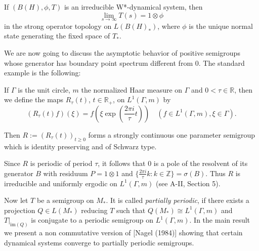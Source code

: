 \begin{corollary}\label{cor:d4-3-9}
If \((B(H),\phi,T)\) is an irreducible W*-dynamical system, then
\[
\lim_{s \to \infty} T(s) = 1 \otimes \phi
\]
in the strong operator topology on \(L(B(H)_{*})\), where \(\phi\) is the unique normal state generating the fixed space of \(T_{*}\).
\end{corollary}

We are now going to discuss the asymptotic behavior of positive semigroups whose generator has boundary point spectrum different from \(0\).
The standard example is the following:

If \(\Gamma\) is the unit circle, \(m\) the normalized Haar measure on \(\Gamma\) and \(0 < \tau \in \mathbb{R}\), then we define the maps \(R_{\tau}(t)\), \(t \in \mathbb{R}_{+}\), on \(L^{1}(\Gamma,m)\) by
\[
(R_{\tau}(t)f)(\xi) = f(\xi\exp(\frac{2\pi i}{\tau}t)) \quad (f \in L^{1}(\Gamma,m), \xi \in \Gamma).
\]

Then \(R := (R_{\tau}(t))_{t \geq 0}\) forms a strongly continuous one parameter semigroup which is identity preserving and of Schwarz type.


\newpage

Since \(R\) is periodic of period \(\tau\), it follows that 0 is a pole of the resolvent of its generator \(B\) with residuum \(P = 1 \otimes 1\) and \(\{\frac{2\pi i}{\tau}k: k \in \mathbb{Z}\} = \sigma(B)\).
Thus \(R\) is irreducible and uniformly ergodic on \(L^{1}(\Gamma,m)\) (see A-II, Section 5).

Now let \(T\) be a semigroup on \(M_{*}\).
It is called \textit{partially periodic}, if there exists a projection \(Q \in L(M_{*})\) reducing \(T\) such that \(Q(M_{*}) \cong L^{1}(\Gamma,m)\) and \(T|_{\text{im}(Q)}\) is conjugate to a periodic semigroup on \(L^{1}(\Gamma,m)\).
In the main result we present a non commutative version of [Nagel (1984)] showing that certain dynamical systems converge to partially periodic semigroups.

